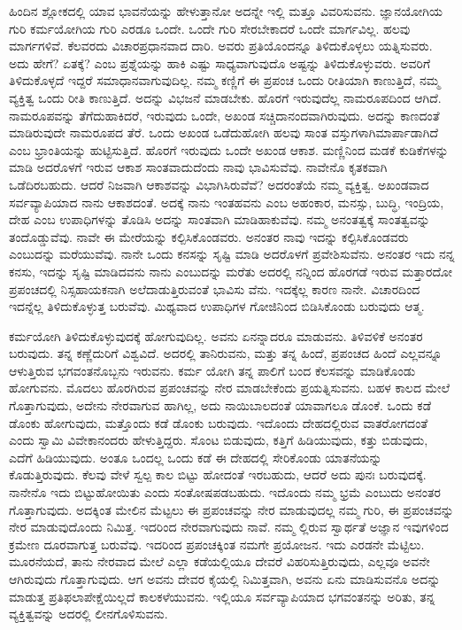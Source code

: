 ಹಿಂದಿನ ಶ್ಲೋಕದಲ್ಲಿ ಯಾವ ಭಾವನೆಯನ್ನು ಹೇಳುತ್ತಾನೋ ಅದನ್ನೇ ಇಲ್ಲಿ ಮತ್ತೂ ವಿವರಿ\-ಸುವನು. ಜ್ಞಾನಯೋಗಿಯ ಗುರಿ ಕರ್ಮಯೋಗಿಯ ಗುರಿ ಎರಡೂ ಒಂದೇ. ಒಂದೇ ಗುರಿ ಸೇರಬೇಕಾದರೆ ಒಂದೇ ಮಾರ್ಗವಿಲ್ಲ. ಹಲವು ಮಾರ್ಗಗಳಿವೆ. ಕೆಲವರದು ವಿಚಾರಪ್ರಧಾನವಾದ ದಾರಿ. ಅವರು ಪ್ರತಿಯೊಂದನ್ನೂ ತಿಳಿದುಕೊಳ್ಳಲು ಯತ್ನಿಸುವರು. ಅದು ಹೇಗೆ? ಏತಕ್ಕೆ? ಎಂಬ ಪ್ರಶ್ನೆಯನ್ನು ಹಾಕಿ ಎಷ್ಟು ಸಾಧ್ಯವಾಗುವುದೊ ಅಷ್ಟನ್ನು ತಿಳಿದುಕೊಳ್ಳುವರು. ಅವರಿಗೆ ತಿಳಿದುಕೊಳ್ಳದೆ ಇದ್ದರೆ ಸಮಾಧಾನವಾಗುವುದಿಲ್ಲ. ನಮ್ಮ ಕಣ್ಣಿಗೆ ಈ ಪ್ರಪಂಚ ಒಂದು ರೀತಿಯಾಗಿ ಕಾಣುತ್ತಿದೆ, ನಮ್ಮ ವ್ಯಕ್ತಿತ್ವ ಒಂದು ರೀತಿ ಕಾಣುತ್ತಿದೆ. ಅದನ್ನು ವಿಭಜನೆ ಮಾಡಬೇಕು. ಹೊರಗೆ ಇರುವುದೆಲ್ಲ ನಾಮರೂಪದಿಂದ ಆಗಿದೆ. ನಾಮರೂಪವನ್ನು ತೆಗೆದುಹಾಕಿದರೆ, ಇರುವುದು ಒಂದೇ, ಅಖಂಡ ಸಚ್ಚಿದಾನಂದವಾಗಿರುವುದು. ಅದನ್ನು ಕಾಣದಂತೆ ಮಾಡಿರುವುದೇ ನಾಮರೂಪದ ತೆರೆ. ಒಂದು ಅಖಂಡ ಒಡೆದುಹೋಗಿ ಹಲವು ಸಾಂತ ವಸ್ತುಗಳಾಗಿ\break ಮಾರ್ಪಾಡಾಗಿದೆ ಎಂಬ ಭ್ರಾಂತಿಯನ್ನು ಹುಟ್ಟಿಸುತ್ತಿದೆ. ಹೊರಗೆ ಇರುವುದು ಒಂದೇ ಅಖಂಡ ಆಕಾಶ. ಮಣ್ಣಿನಿಂದ ಮಡಕೆ ಕುಡಿಕೆಗಳನ್ನು ಮಾಡಿ ಅದರೊಳಗೆ ಇರುವ ಆಕಾಶ ಸಾಂತವಾದು\-ದೆಂದು ನಾವು ಭಾವಿಸುವೆವು. ನಾವೇನೊ ಕೃತಕವಾಗಿ ಒಡೆದಿರಬಹುದು. ಆದರೆ ನಿಜವಾಗಿ ಆಕಾಶವನ್ನು ವಿಭಾಗಿಸಿರುವೆವೆ? ಅದರಂತೆಯೆ ನಮ್ಮ ವ್ಯಕ್ತಿತ್ವ. ಅಖಂಡವಾದ ಸರ್ವವ್ಯಾಪಿಯಾದ ನಾನು ಆಕಾಶದಂತೆ. ಅದಕ್ಕೆ ನಾನು ಇಂತಹವನು ಎಂಬ ಅಹಂಕಾರ, ಮನಸ್ಸು, ಬುದ್ಧಿ, ಇಂದ್ರಿಯ, ದೇಹ ಎಂಬ ಉಪಾಧಿಗಳನ್ನು ತೊಡಿಸಿ ಅದನ್ನು ಸಾಂತವಾಗಿ ಮಾಡಿಹಾಕುವೆವು. ನಮ್ಮ ಅನಂತತ್ವಕ್ಕೆ ಸಾಂತತ್ವವನ್ನು ತಂದೊಡ್ಡುವೆವು. ನಾವೇ ಈ ಮೇರೆಯನ್ನು ಕಲ್ಪಿಸಿಕೊಂಡವರು. ಅನಂತರ ನಾವು ಇದನ್ನು ಕಲ್ಪಿಸಿಕೊಂಡವರು ಎಂಬುದನ್ನು ಮರೆಯುವೆವು. ನಾನೇ ಒಂದು ಕನಸನ್ನು ಸೃಷ್ಟಿ ಮಾಡಿ ಅದರೊಳಗೆ ಪ್ರವೇಶಿಸುವೆನು. ಅನಂತರ ಇದು ನನ್ನ ಕನಸು, ಇದನ್ನು ಸೃಷ್ಟಿ ಮಾಡಿದವನು ನಾನು ಎಂಬುದನ್ನು ಮರೆತು ಅದರಲ್ಲಿ ನನ್ನಿಂದ ಹೊರಗಡೆ ಇರುವ ಮತ್ತಾರದೋ ಪ್ರಪಂಚದಲ್ಲಿ ನಿಸ್ಸಹಾಯಕನಾಗಿ ಅಲೆದಾಡುತ್ತಿರುವಂತೆ ಭಾವಿಸು ವೆನು. ಇದಕ್ಕೆಲ್ಲ ಕಾರಣ ನಾನೇ. ವಿಚಾರದಿಂದ ಇದನ್ನೆಲ್ಲ ತಿಳಿದುಕೊಳ್ಳುತ್ತ ಬರುವೆವು. ಮಿಥ್ಯವಾದ ಉಪಾಧಿಗಳ ಗೋಜಿನಿಂದ ಬಿಡಿಸಿಕೊಂಡು ಬರುವುದು ಆತ್ಮ.

ಕರ್ಮಯೋಗಿ ತಿಳಿದುಕೊಳ್ಳುವುದಕ್ಕೆ ಹೋಗುವುದಿಲ್ಲ. ಅವನು ಏನನ್ನಾದರೂ ಮಾಡುವನು. ತಿಳಿವಳಿಕೆ ಅನಂತರ ಬರುವುದು. ತನ್ನ ಕಣ್ಣೆದುರಿಗೆ ವಿಶ್ವವಿದೆ. ಅದರಲ್ಲಿ ತಾನಿರುವನು, ಮತ್ತು ತನ್ನ ಹಿಂದೆ, ಪ್ರಪಂಚದ ಹಿಂದೆ ಎಲ್ಲವನ್ನೂ ಆಳುತ್ತಿರುವ ಭಗವಂತನೊಬ್ಬನು ಇರುವನು. ಕರ್ಮ ಯೋಗಿ ತನ್ನ ಪಾಲಿಗೆ ಬಂದ ಕೆಲಸವನ್ನು ಮಾಡಿಕೊಂಡು ಹೋಗುವನು. ಮೊದಲು ಹೊರಗಿರುವ ಪ್ರಪಂಚವನ್ನು ನೇರ ಮಾಡಬೇಕೆಂದು ಪ್ರಯತ್ನಿಸುವನು. ಬಹಳ ಕಾಲದ ಮೇಲೆ ಗೊತ್ತಾಗುವುದು, ಅದೇನು ನೇರವಾಗುವ ಹಾಗಿಲ್ಲ, ಅದು ನಾಯಿಬಾಲದಂತೆ ಯಾವಾಗಲೂ ಡೊಂಕೆ. ಒಂದು ಕಡೆ ಡೊಂಕು ಹೋಗುವುದು, ಮತ್ತೊಂದು ಕಡೆ ಡೊಂಕು ಬರುವುದು. ಇದೊಂದು ದೇಹದಲ್ಲಿರುವ ವಾತರೋಗದಂತೆ ಎಂದು ಸ್ವಾಮಿ ವಿವೇಕಾನಂದರು ಹೇಳುತ್ತಿದ್ದರು. ಸೊಂಟ ಬಿಡುವುದು, ಕತ್ತಿಗೆ ಹಿಡಿಯುವುದು, ಕತ್ತು ಬಿಡುವುದು, ಎದೆಗೆ ಹಿಡಿಯುವುದು. ಅಂತೂ ಒಂದಲ್ಲ ಒಂದು ಕಡೆ ಈ ದೇಹದಲ್ಲಿ ಸೇರಿಕೊಂಡು ಯಾತನೆಯನ್ನು ಕೊಡುತ್ತಿರುವುದು. ಕೆಲವು ವೇಳೆ ಸ್ವಲ್ಪ ಕಾಲ ಬಿಟ್ಟು ಹೋದಂತೆ ಇರಬಹುದು, ಆದರೆ ಅದು ಪುನಃ ಬರುವುದಕ್ಕೆ. ನಾನೇನೊ ಇದು ಬಿಟ್ಟುಹೋಯಿತು ಎಂದು ಸಂತೋಷಪಡಬಹುದು. ಇದೊಂದು ನಮ್ಮ ಭ್ರಮೆ ಎಂಬುದು ಅನಂತರ ಗೊತ್ತಾಗುವುದು. ಅದಕ್ಕಿಂತ ಮೇಲಿನ ಮೆಟ್ಟಲು ಈ ಪ್ರಪಂಚವನ್ನು ನೇರ ಮಾಡುವುದಲ್ಲ ನಮ್ಮ ಗುರಿ, ಈ ಪ್ರಪಂಚವನ್ನು ನೇರ ಮಾಡುವುದೊಂದು ನಿಮಿತ್ತ. ಇದರಿಂದ ನೇರವಾಗುವುದು ನಾವೆ. ನಮ್ಮ ಲ್ಲಿರುವ ಸ್ವಾರ್ಥತೆ ಅಜ್ಞಾನ ಇವುಗಳಿಂದ ಕ್ರಮೇಣ ದೂರವಾಗುತ್ತ ಬರುವೆವು. ಇದರಿಂದ ಪ್ರಪಂಚಕ್ಕಿಂತ ನಮಗೇ ಪ್ರಯೋಜನ. ಇದು ಎರಡನೇ ಮೆಟ್ಟಿಲು. ಮೂರನೆಯದೆ, ತಾನು ನೇರವಾದ ಮೇಲೆ ಎಲ್ಲಾ ಕಡೆಯಲ್ಲಿಯೂ ದೇವರೆ ವಿಹರಿಸುತ್ತಿರುವುದು, ಎಲ್ಲವೂ ಅವನೇ ಆಗಿರುವುದು ಗೊತ್ತಾಗುವುದು. ಆಗ ಅವನು ದೇವರ ಕೈಯಲ್ಲಿ ನಿಮಿತ್ತವಾಗಿ, ಅವನು ಏನು ಮಾಡಿಸುವನೊ ಅದನ್ನು ಮಾಡುತ್ತ ಪ್ರತಿಫಲಾಪೇಕ್ಷೆಯಿಲ್ಲದೆ ಕಾಲಕಳೆಯುವನು. ಇಲ್ಲಿಯೂ ಸರ್ವವ್ಯಾಪಿಯಾದ ಭಗವಂತನನ್ನು ಅರಿತು, ತನ್ನ ವ್ಯಕ್ತಿತ್ವವನ್ನು ಅದರಲ್ಲಿ ಲೀನಗೊಳಿಸುವನು.

